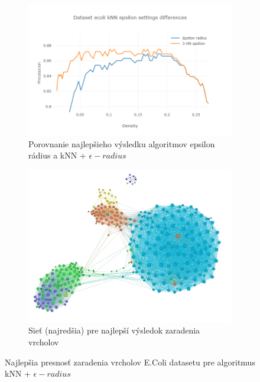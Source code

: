 \documentclass[slovak,master,dept460,male,cpp,cpdeclaration]{diploma}
\begin{document}
\begin{figure}[H]
\centering
\begin{subfigure}{0.45\textwidth}
    \centering
    \includegraphics[width=\linewidth]{Plots/plot_ecoli_knn_epsilon_best.png}
    \caption{Porovnanie najlepšieho výsledku algoritmov epsilon rádius a kNN + $\epsilon-radius$}
\end{subfigure}
\begin{subfigure}{0.45\textwidth}
    \centering
    \includegraphics[width=\linewidth]{Graphs/network_ecoli_knn_epsilon_best.jpg}
    \caption{Sieť (najredšia) pre najlepší výsledok zaradenia vrcholov}
\end{subfigure}\hfil
\caption{Najlepšia presnosť zaradenia vrcholov E.Coli datasetu pre algoritmus kNN + $\epsilon-radius$}
\label{ecoli_knn_epsilon_best}
\end{figure}
\end{document}
